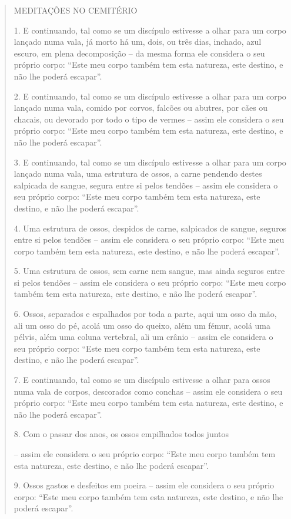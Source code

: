 \begin{quote}
MEDITAÇÕES NO CEMITÉRIO

1. E continuando, tal como se um discípulo estivesse a olhar para um corpo lançado numa vala, já morto há um, dois, ou três dias, inchado, azul escuro, em plena decomposição -- da mesma forma ele considera o seu próprio corpo: ``Este meu corpo também tem esta natureza, este destino, e não lhe poderá escapar''.

2. E continuando, tal como se um discípulo estivesse a olhar para um corpo lançado numa vala, comido por corvos, falcões ou abutres, por cães ou chacais, ou devorado por todo o tipo de vermes -- assim ele considera o seu próprio corpo: ``Este meu corpo também tem esta natureza, este destino, e não lhe poderá escapar''.

3. E continuando, tal como se um discípulo estivesse a olhar para um corpo lançado numa vala, uma estrutura de ossos, a carne pendendo destes salpicada de sangue, segura entre si pelos tendões -- assim ele considera o seu próprio corpo: ``Este meu corpo também tem esta natureza, este destino, e não lhe poderá escapar''.

4. Uma estrutura de ossos, despidos de carne, salpicados de sangue, seguros entre si pelos tendões -- assim ele considera o seu próprio corpo: ``Este meu corpo também tem esta natureza, este destino, e não lhe poderá escapar''.

5. Uma estrutura de ossos, sem carne nem sangue, mas ainda seguros entre si pelos tendões -- assim ele considera o seu próprio corpo: ``Este meu corpo também tem esta natureza, este destino, e não lhe poderá escapar''.

6. Ossos, separados e espalhados por toda a parte, aqui um osso da mão, ali um osso do pé, acolá um osso do queixo, além um fémur, acolá uma pélvis, além uma coluna vertebral, ali um crânio -- assim ele considera o seu próprio corpo: ``Este meu corpo também tem esta natureza, este destino, e não lhe poderá escapar''.

7. E continuando, tal como se um discípulo estivesse a olhar para ossos numa vala de corpos, descorados como conchas -- assim ele considera o seu próprio corpo: ``Este meu corpo também tem esta natureza, este destino, e não lhe poderá escapar''.

8. Com o passar dos anos, os ossos empilhados todos juntos

-- assim ele considera o seu próprio corpo: ``Este meu corpo também tem esta natureza, este destino, e não lhe poderá escapar''.

9. Ossos gastos e desfeitos em poeira -- assim ele considera o seu próprio corpo: ``Este meu corpo também tem esta natureza, este destino, e não lhe poderá escapar''.


\end{quote}

